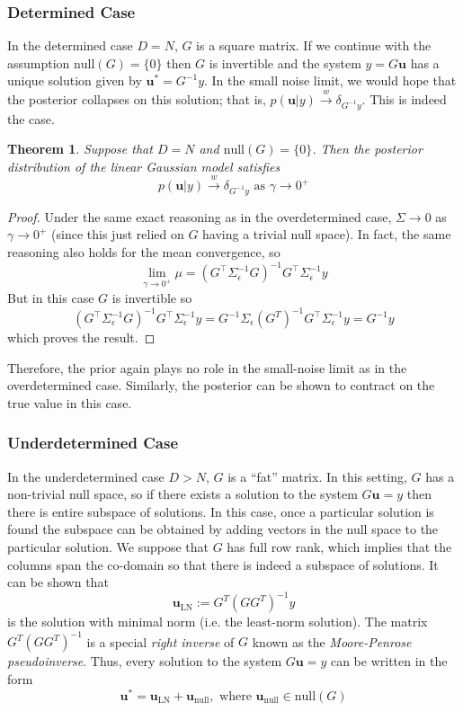\documentclass[12pt]{article}
\newcommand{\bpar}{\mathbf{u}} %
\newtheorem{thm}{Theorem}
\begin{document}
\subsubsection{Determined Case}
In the determined case $D = N$, $G$ is a square matrix. If we continue with the assumption $\text{null}(G) = \{0\}$ then $G$ is invertible and the system $y = G\bpar$ has 
a unique solution given by $\bpar^* = G^{-1}y$. In the small noise limit, we would hope that the posterior collapses on this solution; that is, 
$p(\bpar|y) \overset{w}{\to} \delta_{G^{-1}y}$. This is indeed the case. 

\begin{thm}
Suppose that $D = N$ and $\text{null}(G) = \{0\}$. Then the posterior distribution of the linear Gaussian model satisfies
\[p(\bpar|y) \overset{w}{\to} \delta_{G^{-1}y} \text{ as } \gamma \to 0^+\]
\end{thm}

\begin{proof}
Under the same exact reasoning as in the overdetermined case, $\Sigma \to 0$ as $\gamma \to 0^+$ (since this just relied on $G$ having a trivial null space). In fact, the 
same reasoning also holds for the mean convergence, so 
\[\lim_{\gamma \to 0^+} \mu = \left(G^{\top} \Sigma_{\epsilon}^{-1} G \right)^{-1} G^{\top} \Sigma_{\epsilon}^{-1} y\]
But in this case $G$ is invertible so 
\[\left(G^{\top} \Sigma_{\epsilon}^{-1} G \right)^{-1} G^{\top} \Sigma_{\epsilon}^{-1} y = G^{-1} \Sigma_{\epsilon} \left(G^{T}\right)^{-1} G^{\top} \Sigma_{\epsilon}^{-1} y = G^{-1}y\]
which proves the result. 
\end{proof}
Therefore, the prior again plays no role in the small-noise limit as in the overdetermined case. Similarly, the posterior can be shown to contract on the true value in this case. 

\subsubsection{Underdetermined Case}
In the underdetermined case $D > N$, $G$ is a ``fat'' matrix. In this setting, $G$ has a non-trivial null space, so if there exists a solution to the system $G\bpar = y$ then there 
is entire subspace of solutions. In this case, once a particular solution is found the subspace can be obtained by adding vectors in the null space to the particular solution. 
We suppose that $G$ has full row rank, which implies that the columns span the co-domain so that there is indeed a subspace of solutions. It can be shown that 
\[\bpar_{\text{LN}} := G^T (GG^T)^{-1}y\]
is the solution with minimal norm (i.e. the least-norm solution). The matrix $G^T(G G^T)^{-1}$ is a special \textit{right inverse} of $G$ known as the \textit{Moore-Penrose pseudoinverse}. 
Thus, every solution to the system $G\bpar = y$ can be written in the form 
\[\bpar^* = \bpar_{\text{LN}} + \bpar_{\text{null}}, \text{ where } \bpar_{\text{null}} \in \text{null}(G)\]
\end{document}
